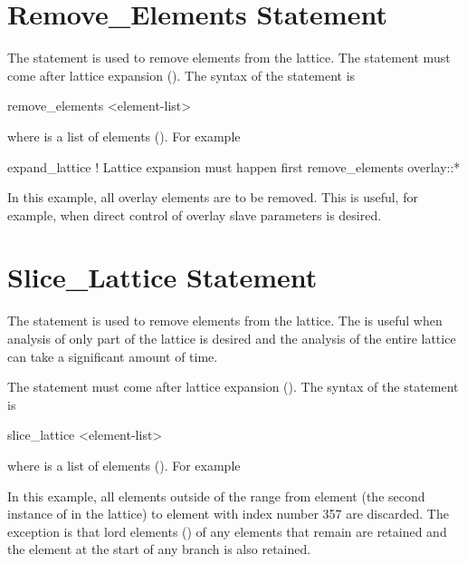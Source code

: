 {{{{{%
\section{Remove_Elements Statement}
\label{s:remove.ele}

The  statement is used to remove elements from the lattice. The
 statement must come after lattice expansion (). The syntax of
the  statement is
\begin{example}
  remove_elements <element-list>
\end{example}
where  is a list of elements (). For example
\begin{example}
  expand_lattice              ! Lattice expansion must happen first
  remove_elements overlay::*
\end{example}
In this example, all overlay elements are to be removed. This is useful, for example, when direct control
of overlay slave parameters is desired.

\section{Slice_Lattice Statement}
\label{s:slice}

The  statement is used to remove elements from the lattice. The 
is useful when analysis of only part of the lattice is desired and the analysis of the entire
lattice can take a significant amount of time.

The  statement must come after lattice expansion (). The syntax of
the  statement is
\begin{example}
  slice_lattice <element-list>
\end{example}
where  is a list of elements (). For example
In this example, all elements outside of the range from element  (the second instance of
 in the lattice) to element with index number 357 are discarded. The exception is that lord
elements () of any elements that remain are retained and the 
element at the start of any branch is also retained.

}}}}}
